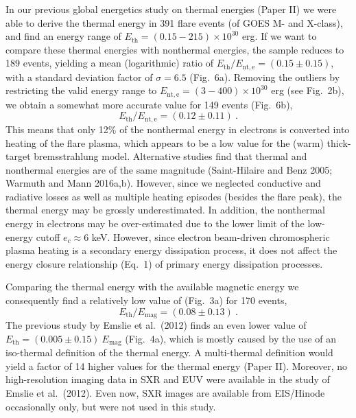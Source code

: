 \documentclass[10pt,preprint]{aastex}  %
\begin{document}
In our previous global energetics study on thermal energies (Paper II)
we were able to derive the thermal energy in 391 flare events
(of GOES M- and X-class), and find an energy range of
$E_{\mathrm{th}}=(0.15 - 215) \times 10^{30}$ erg. If we want to compare
these thermal energies with nonthermal energies, the sample reduces
to 189 events, yielding a mean (logarithmic) ratio of 
$E_{\mathrm{th}}/E_{\mathrm{nt,e}} = (0.15 \pm 0.15)$, 
with a standard deviation
factor of $\sigma = 6.5$ (Fig.~6a). Removing the outliers
by restricting the valid energy range to $E_{\mathrm{nt,e}}=(3 - 400) \times
10^{30}$ erg (see Fig.~2b), we obtain a somewhat more accurate
value for 149 events (Fig.~6b), 
\begin{equation}
	E_{\mathrm{th}} / E_{\mathrm{nt,e}} = (0.12 \pm 0.11) \ .
\end{equation}
This means that only 12\% of the nonthermal energy in electrons
is converted into heating of the flare plasma, which appears to be
a low value for the (warm) thick-target bremsstrahlung model. 
Alternative studies find that thermal and nonthermal energies
are of the same magnitude (Saint-Hilaire and Benz 2005;
Warmuth and Mann 2016a,b). 
However, since we neglected conductive and radiative losses as
well as multiple heating episodes (besides the flare peak),
the thermal energy may be grossly underestimated. In addition,
the nonthermal energy in electrons may be over-estimated
due to the lower limit of the low-energy cutoff $e_c \approx 6$ keV. 
However, since electron beam-driven chromospheric plasma heating 
is a secondary energy dissipation process, it does not affect 
the energy closure relationship (Eq.~1) of primary energy 
dissipation processes. 

Comparing the thermal energy with the available magnetic energy
we consequently find a relatively low value of (Fig.~3a) for
170 events, 
\begin{equation}
	E_{\mathrm{th}} / E_{\mathrm{mag}} = (0.08 \pm 0.13) \ .
\end{equation}
The previous study by Emslie et al.~(2012) finds an even 
lower value of $E_{\mathrm{th}} = (0.005 \pm 0.15) \ E_{\mathrm{mag}}$ 
(Fig.~4a), which
is mostly caused by the use of an iso-thermal definition of the thermal 
energy. A multi-thermal definition would yield a factor
of 14 higher values for the thermal energy (Paper II). Moreover,
no high-resolution imaging data in SXR and EUV were 
available in the study of Emslie et al.~(2012).
Even now, SXR images are available from EIS/Hinode occasionally
only, but were not used in this study.
\end{document}
